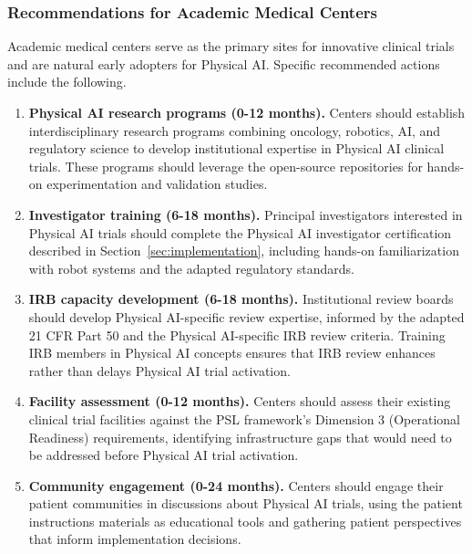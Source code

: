\subsubsection{Recommendations for Academic Medical Centers}

Academic medical centers serve as the primary sites for innovative clinical
trials and are natural early adopters for Physical AI. Specific recommended
actions include the following.

\begin{enumerate}[nosep]
  \item \textbf{Physical AI research programs (0-12 months).} Centers should
    establish interdisciplinary research programs combining oncology, robotics,
    AI, and regulatory science to develop institutional expertise in Physical
    AI clinical trials. These programs should leverage the open-source
    repositories \cite{main-repo, mcp-repo, fl-repo} for hands-on
    experimentation and validation studies.

  \item \textbf{Investigator training (6-18 months).} Principal investigators
    interested in Physical AI trials should complete the Physical AI
    investigator certification described in Section~\ref{sec:implementation},
    including hands-on familiarization with robot systems and the adapted
    regulatory standards.

  \item \textbf{IRB capacity development (6-18 months).} Institutional review
    boards should develop Physical AI-specific review expertise, informed by
    the adapted 21 CFR Part 50 \cite{cfr50-adapt} and the Physical AI-specific
    IRB review criteria. Training IRB members in Physical AI concepts ensures
    that IRB review enhances rather than delays Physical AI trial activation.

  \item \textbf{Facility assessment (0-12 months).} Centers should assess
    their existing clinical trial facilities against the PSL framework's
    Dimension 3 (Operational Readiness) requirements, identifying
    infrastructure gaps that would need to be addressed before Physical AI
    trial activation.

  \item \textbf{Community engagement (0-24 months).} Centers should engage
    their patient communities in discussions about Physical AI trials, using
    the patient instructions materials \cite{patient-instructions-paper} as
    educational tools and gathering patient perspectives that inform
    implementation decisions.
\end{enumerate}

